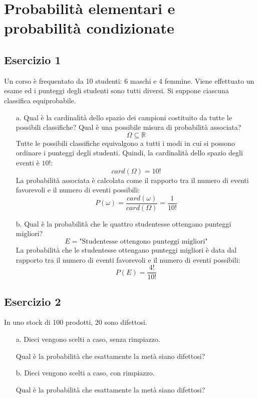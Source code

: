 \documentclass[a4paper]{article}
\theoremstyle{break}
\theoremstyle{break}
\theoremstyle{break}
\theoremstyle{break}
\begin{document}


\tableofcontents
\pagebreak

\section{Probabilità elementari e probabilità condizionate}
\subsection{Esercizio 1}
Un corso è frequentato da 10 studenti: 6 maschi e 4 femmine. Viene effettuato un
esame ed i punteggi degli studenti sono tutti diversi. Si suppone ciascuna classifica
equiprobabile.
\begin{enumerate}
	\item[a.] Qual è la cardinalità dello spazio dei campioni costituito da tutte le
	      possibili classifiche? Qual è una possibile misura di probabilità associata?
	      \[
		      \Omega \subseteq \mathbb{R}
	      \]
	      Tutte le possibili classifiche equivalgono a tutti i modi in cui si possono
	      ordinare i punteggi degli studenti. Quindi, la cardinalità dello spazio degli
	      eventi è $10!$:
	      \[
		      card(\Omega) = 10!
	      \]
	      La probabilità associata è calcolata come il rapporto tra il numero di eventi
	      favorevoli e il numero di eventi possibili:
	      \[
		      P(\omega) = \frac{card(\omega)}{card(\Omega)} = \frac{1}{10!}
	      \]
	\item[b.] Qual è la probabilità che le quattro studentesse ottengano punteggi migliori?
	      \[
		      E = \text{"Studentesse ottengono punteggi migliori"}
	      \]
	      La probabilità che le studentesse ottengano punteggi migliori è data dal rapporto
	      tra il numero di eventi favorevoli e il numero di eventi possibili:
	      \[
		      P(E) = \frac{4!}{10!}
	      \]
\end{enumerate}

\subsection{Esercizio 2}
In uno stock di 100 prodotti, 20 sono difettosi.
\begin{enumerate}
	\item[a.] Dieci vengono scelti a caso, senza rimpiazzo.

	      \noindent Qual è la probabilità che esattamente la metà siano difettosi?
	\item[b.] Dieci vengono scelti a caso, con rimpiazzo.

	      \noindent Qual è la probabilità che esattamente la metà siano difettosi?
\end{enumerate}
\end{document}
